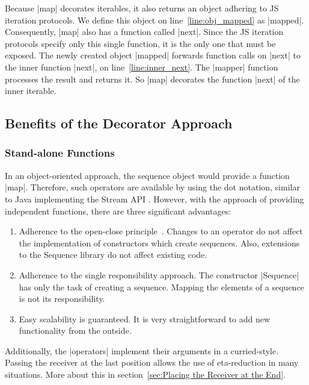 Because |map| decorates iterables, it also returns an object adhering to JS
iteration protocols. We define this object on line~\ref{line:obj_mapped} as
|mapped|. Consequently, |map| also has a function called |next|. Since the JS
iteration protocols specify only this single function, it is the only one that
must be exposed. The newly created object |mapped| forwards function
calls on |next| to the inner function |next|, on line~\ref{line:inner_next}.
The |mapper| function processes the result and returns it. So |map|
decorates the function |next| of the inner iterable.

\subsection{Benefits of the Decorator Approach}
\label{sub:Benefits of the Decorator Approach}
\subsubsection{Stand-alone Functions}
\label{subsub:Standalone Functions}
In an object-oriented approach, the sequence object would provide a function
|map|. Therefore, such operators are available by using the dot notation,
similar to Java implementing the Stream API \cite{java_stream}. 
However, with the approach of providing independent functions, there 
are three significant advantages:

\begin{enumerate}
  \item {Adherence to the open-close
      principle~\cite[p.~3]{eilebrecht_patterns_2019}. Changes to an operator
      do not affect the implementation of constructors which create sequences. Also,
      extensions to the Sequence library do not affect existing code.
    }
  \item{Adherence to the single responsibility approach. The constructor
    |Sequence| has only the task of creating a sequence. Mapping the elements
  of a sequence is not its responsibility. }
  \item{Easy scalability is guaranteed. It is very straightforward to add new
    functionality from the outside. }
\end{enumerate}

Additionally, the |operators| implement their arguments in a curried-style.
Passing the receiver at the last position allows the use of eta-reduction in
many situations. More about this in section~\ref{sec:Placing the Receiver at
the End}.

